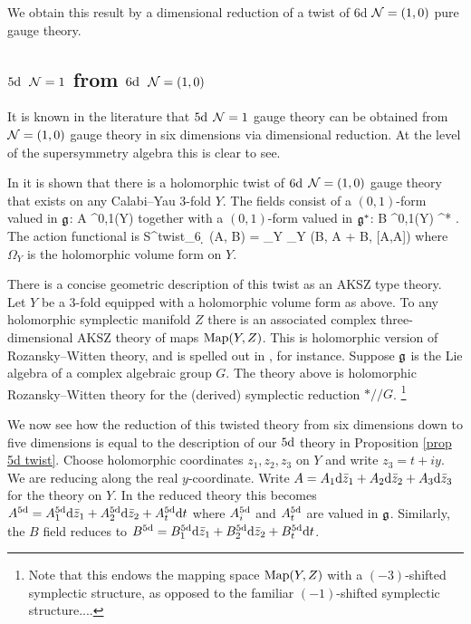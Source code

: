 We obtain this result by a dimensional reduction of a twist of 6d $\mathcal N = (1,0)$ pure gauge theory. 

\subsection{$5{\rm d}$ $\mathcal N=1$ from $6{\rm d}$ $\mathcal N=(1,0)$}

It is known in the literature that $5{\rm d}$ $\mathcal N=1$ gauge theory can be obtained from $\mathcal N=(1,0)$ gauge theory in six dimensions via dimensional reduction. 
At the level of the supersymmetry algebra this is clear to see.  

In  it is shown that there is a holomorphic twist of $6{\rm d}$ $\mathcal N=(1,0)$ gauge theory that exists on any Calabi--Yau 3-fold $Y$.
The fields consist of a $(0,1)$-form valued in $\mathfrak g$:
\ben
A \in \Omega^{0,1}(Y) \tensor \fg
\een
together with a $(0,1)$-form valued in $\mathfrak g^*$:
\ben
B \in \Omega^{0,1}(Y) \tensor \fg^* .
\een
The action functional is
\ben
S^{twist}_{6 \d} (A, B) = \int_Y \Omega_Y \left(\<B, \dbar A\> + \<B, [A,A]\>\right)
\een
where $\Omega_Y$ is the holomorphic volume form on $Y$. 
 
\begin{rmk}
There is a concise geometric description of this twist as an AKSZ type theory.
Let $Y$ be a $3$-fold equipped with a holomorphic volume form as above.
To any holomorphic symplectic manifold $Z$ there is an associated complex three-dimensional AKSZ theory of maps ${\rm Map}(Y,Z)$.
This is holomorphic version of Rozansky--Witten theory, and is spelled out in \cite{QZ}, for instance.
Suppose $\mathfrak g$ is the Lie algebra of a complex algebraic group $G$. 
The theory above is holomorphic Rozansky--Witten theory for the (derived) symplectic reduction $* // G$. \footnote{Note that this endows the mapping space ${\rm Map}(Y,Z)$ with a $(-3)$-shifted symplectic structure, as opposed to the familiar $(-1)$-shifted symplectic structure....}
\end{rmk}

We now see how the reduction of this twisted theory from six dimensions down to five dimensions is equal to the description of our $5{\rm d}$ theory in Proposition \ref{prop 5d twist}. 
Choose holomorphic coordinates $z_1, z_2, z_3$ on $Y$ and write $z_3 = t + i y$. 
We are reducing along the real $y$-coordinate. 
Write $A = A_1 {\rm d} \Bar{z}_1 + A_2 {\rm d} \Bar{z}_2 + A_3 {\rm d} \Bar{z}_3$ for the theory on $Y$.
In the reduced theory this becomes $A^{5 {\rm d}} = A^{5 {\rm d}}_1 {\rm d} \Bar{z}_1 + A^{5 {\rm d}}_2 {\rm d} \Bar{z}_2 + A^{5 {\rm d}}_t {\rm d} t$ where $A_i^{5 {\rm d}}$ and $A_{t}^{5 {\rm d}}$ are valued in $\mathfrak g$. 
Similarly, the $B$ field reduces to $B^{5 {\rm d}} = B^{5 {\rm d}}_1 {\rm d} \Bar{z}_1 + B^{5 {\rm d}}_2 {\rm d} \Bar{z}_2 + B^{5 {\rm d}}_t {\rm d} t$. 

